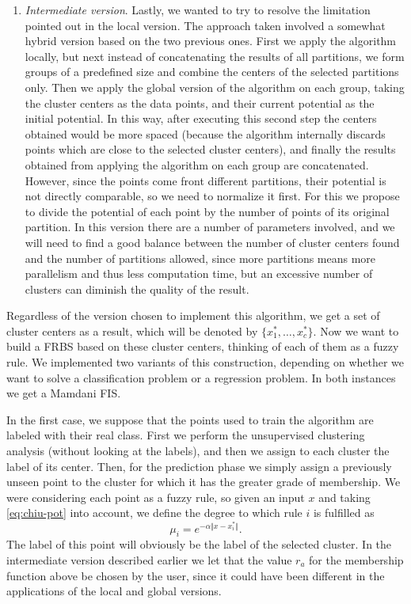 \begin{enumerate}[1.]
\item \textit{Intermediate version}. Lastly, we wanted to try to resolve the limitation pointed out in the local version. The approach taken involved a somewhat hybrid version based on the two previous ones. First we apply the algorithm locally, but next instead of concatenating the results of all partitions, we form groups of a predefined size and combine the centers of the selected partitions only. Then we apply the global version of the algorithm on each group, taking the cluster centers as the data points, and their current potential as the initial potential. In this way, after executing this second step the centers obtained would be more spaced (because the algorithm internally discards points which are close to the selected cluster centers), and finally the results obtained from applying the algorithm on each group are concatenated. However, since the points come front different partitions, their potential is not directly comparable, so we need to normalize it first. For this we propose to divide the potential of each point by the number of points of its original partition. In this version there are a number of parameters involved, and we will need to find a good balance between the number of cluster centers found and the number of partitions allowed, since more partitions means more parallelism and thus less computation time, but an excessive number of clusters can diminish the quality of the result.
\end{enumerate}

Regardless of the version chosen to implement this algorithm, we get a set of cluster centers as a result, which will be denoted by $\{x_1^\ast, \dots, x_c^\ast \}$. Now we want to build a FRBS based on these cluster centers, thinking of each of them as a fuzzy rule. We implemented two variants of this construction, depending on whether we want to solve a classification problem or a regression problem. In both instances we get a Mamdani FIS.

In the first case, we suppose that the points used to train the algorithm are labeled with their real class. First we perform the unsupervised clustering analysis (without looking at the labels), and then we assign to each cluster the label of its center. Then, for the prediction phase we simply assign a previously unseen point to the cluster for which it has the greater grade of membership. We were considering each point as a fuzzy rule, so given an input $x$ and taking \eqref{eq:chiu-pot} into account, we define the degree to which rule $i$ is fulfilled as
\[
\mu_i = e^{-\alpha \Vert x - x_i^\ast \Vert}.
\]
The label of this point will obviously be the label of the selected cluster. In the intermediate version described earlier we let that the value $r_a$ for the membership function above be chosen by the user, since it could have been different in the applications of the local and global versions.


